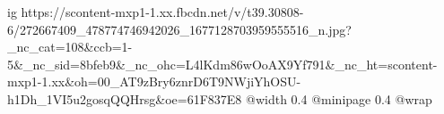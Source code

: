  
 
 
 
 

\ifcmt
  ig https://scontent-mxp1-1.xx.fbcdn.net/v/t39.30808-6/272667409_478774746942026_1677128703959555516_n.jpg?_nc_cat=108&ccb=1-5&_nc_sid=8bfeb9&_nc_ohc=L4lKdm86wOoAX9Yf791&_nc_ht=scontent-mxp1-1.xx&oh=00_AT9zBry6znrD6T9NWjiYhOSU-h1Dh_1VI5u2gosqQQHrsg&oe=61F837E8
  @width 0.4
  @minipage 0.4
  @wrap \parpic[r]
\fi
